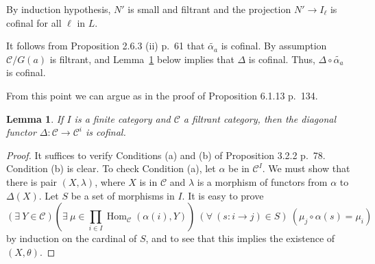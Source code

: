 \documentclass[12pt]{article}
\newtheorem{lem}[thm]{Lemma}
\theoremstyle{remark}
\theoremstyle{definition}
\newcommand{\C}{\mathcal C}
\DeclareMathOperator{\Hom}{Hom}%
\begin{document}
By induction hypothesis, $N'$ is small and filtrant and the projection $N'\to I_\ell$ is cofinal for all $\ell$ in $L$. 

It follows from Proposition 2.6.3 (ii) p.~61 that $\widetilde{\alpha_a}$ is cofinal. By assumption $\C/G(a)$ is filtrant, and Lemma~\ref{delta} below implies that $\Delta$ is cofinal. Thus, $\Delta\circ\widetilde{\alpha_a}$ is cofinal.

From this point we can argue as in the proof of Proposition 6.1.13 p.~134.

\begin{lem}\label{delta}
If $I$ is a finite category and $\C$ a filtrant category, then the diagonal functor $\Delta:\C\to\C^i$ is cofinal.
\end{lem}
%
\begin{proof}
It suffices to verify Conditions (a) and (b) of Proposition 3.2.2 p.~78. Condition (b) is clear. To check Condition (a), let $\alpha$ be in $\C^I$. We must show that there is pair $(X,\lambda)$, where $X$ is in $\C$ and $\lambda$ is a morphism of functors from $\alpha$ to $\Delta(X)$. Let $S$ be a set of morphisms in $I$. It is easy to prove 
$$
(\exists\ Y\in\C)\left(\exists\ \mu\in\prod_{i\in I}\Hom_\C(\alpha(i),Y)\right)\ (\forall\ (s:i\to j)\in S)\ (\mu_{j}\circ\alpha(s)=\mu_i) 
$$ 
by induction on the cardinal of $S$, and to see that this implies the existence of $(X,\theta)$.
\end{proof}
%
%
\end{document}
